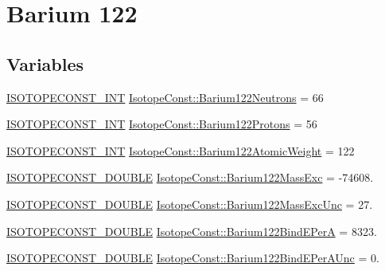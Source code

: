 \hypertarget{group___isotope_const-_barium-_ba122}{}\section{Barium 122}
\label{group___isotope_const-_barium-_ba122}
\subsection*{Variables}
\begin{DoxyCompactItemize}
\item 
\mbox{\hyperlink{group___isotope_const-_macros_ga5f18360b3e99483a35c32d789e62621c}{I\+S\+O\+T\+O\+P\+E\+C\+O\+N\+S\+T\+\_\+\+I\+NT}} \mbox{\hyperlink{group___isotope_const-_barium-_ba122_ga3eecf866a8f7b657ade0c614a8f548c6}{Isotope\+Const\+::\+Barium122\+Neutrons}} = 66
\item 
\mbox{\hyperlink{group___isotope_const-_macros_ga5f18360b3e99483a35c32d789e62621c}{I\+S\+O\+T\+O\+P\+E\+C\+O\+N\+S\+T\+\_\+\+I\+NT}} \mbox{\hyperlink{group___isotope_const-_barium-_ba122_ga79d41d9496dea42aafe65ecf744588bc}{Isotope\+Const\+::\+Barium122\+Protons}} = 56
\item 
\mbox{\hyperlink{group___isotope_const-_macros_ga5f18360b3e99483a35c32d789e62621c}{I\+S\+O\+T\+O\+P\+E\+C\+O\+N\+S\+T\+\_\+\+I\+NT}} \mbox{\hyperlink{group___isotope_const-_barium-_ba122_ga950f36cca25081f19d5474887725eb33}{Isotope\+Const\+::\+Barium122\+Atomic\+Weight}} = 122
\item 
\mbox{\hyperlink{group___isotope_const-_macros_ga8f45a7272ce02c0b4c65c44636ed719a}{I\+S\+O\+T\+O\+P\+E\+C\+O\+N\+S\+T\+\_\+\+D\+O\+U\+B\+LE}} \mbox{\hyperlink{group___isotope_const-_barium-_ba122_ga565d3ffd989468839fe47091230b6c30}{Isotope\+Const\+::\+Barium122\+Mass\+Exc}} = -\/74608.
\item 
\mbox{\hyperlink{group___isotope_const-_macros_ga8f45a7272ce02c0b4c65c44636ed719a}{I\+S\+O\+T\+O\+P\+E\+C\+O\+N\+S\+T\+\_\+\+D\+O\+U\+B\+LE}} \mbox{\hyperlink{group___isotope_const-_barium-_ba122_ga0500278aea42dcc157d4045e398d3483}{Isotope\+Const\+::\+Barium122\+Mass\+Exc\+Unc}} = 27.
\item 
\mbox{\hyperlink{group___isotope_const-_macros_ga8f45a7272ce02c0b4c65c44636ed719a}{I\+S\+O\+T\+O\+P\+E\+C\+O\+N\+S\+T\+\_\+\+D\+O\+U\+B\+LE}} \mbox{\hyperlink{group___isotope_const-_barium-_ba122_ga6df17c6d7333d9695ca0ab2bdb3868bd}{Isotope\+Const\+::\+Barium122\+Bind\+E\+PerA}} = 8323.
\item 
\mbox{\hyperlink{group___isotope_const-_macros_ga8f45a7272ce02c0b4c65c44636ed719a}{I\+S\+O\+T\+O\+P\+E\+C\+O\+N\+S\+T\+\_\+\+D\+O\+U\+B\+LE}} \mbox{\hyperlink{group___isotope_const-_barium-_ba122_gabb69f4e29a9e777000a5f27592c7ac25}{Isotope\+Const\+::\+Barium122\+Bind\+E\+Per\+A\+Unc}} = 0.

\end{DoxyCompactItemize}
